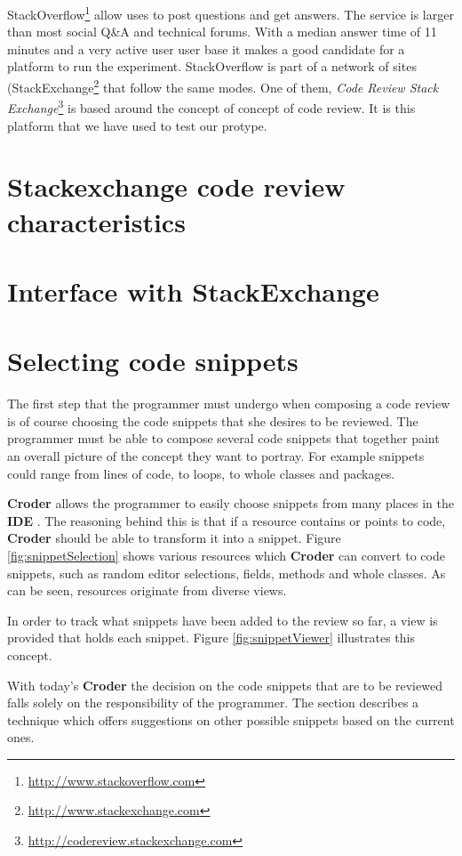 \documentclass{sigchi}
\newcommand{\croder}{\textbf{Croder }}
\newcommand{\IDE}{\textbf{IDE }}
\begin{document}
StackOverflow\footnote{\url{http://www.stackoverflow.com}} allow uses to post questions and get
answers. The service is larger than most social Q\&A and technical forums. With a median answer time 
of 11 minutes and a very active user user base \cite{Mamykina2011} it makes a good candidate for a
platform to run the experiment. StackOverflow is part of a network of sites (StackExchange\footnote{\url{http://www.stackexchange.com}} that follow the same modes. One of them, \emph{Code
Review Stack Exchange}\footnote{\url{http://codereview.stackexchange.com}} is based around the
concept of concept of code review. It is this platform that we have used to test our protype.

\section{Stackexchange code review characteristics}
\section{Interface with StackExchange}

\section{Selecting code snippets}

 The first step that the programmer must undergo when composing a code review is of course choosing the code snippets that she desires to be reviewed. The programmer must be able to compose several code snippets that together paint an overall picture of the concept they want to portray. For example snippets could range from lines of code, to loops, to whole classes and packages.

 \croder allows the programmer to easily choose snippets from many places in the \IDE. The reasoning behind this is that if a resource contains or points to code, \croder should be able to transform it into a snippet. Figure \ref{fig:snippetSelection} shows  various resources which \croder can convert to code snippets, such as random editor selections, fields, methods and whole classes. As can be seen, resources originate from diverse views.

 In order to track what snippets have been added to the review so far, a view is provided that holds each snippet. Figure \ref{fig:snippetViewer} illustrates this concept.
 
 With today's \croder the decision on the code snippets that are to be reviewed falls solely on the responsibility of the programmer. The  section describes a technique which offers suggestions on other possible snippets based on the current ones.
 
\end{document}
